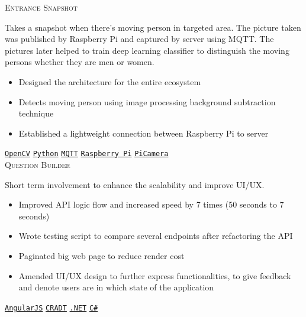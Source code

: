 \documentclass[9pt]{developercv} %
\begin{document}
\begin{entrylist}
{		\textsc{Entrance Snapshot} \\
			{\small Takes a snapshot when there's moving person in targeted area. The picture taken was published by Raspberry Pi and captured by server using MQTT. The pictures later helped to train deep learning classifier to distinguish the moving persons whether they are men or women.
			\begin{itemize}
				\item Designed the architecture for the entire ecosystem
				\item Detects moving person using image processing background subtraction technique
				\item Established a lightweight connection between Raspberry Pi to server
			\end{itemize}}
			\texttt{\href{https://opencv.org/}{OpenCV}}
				\slashsep
			\texttt{\href{https://www.python.org/}{Python}}
				\slashsep
			\texttt{\href{http://mqtt.org/}{MQTT}}
				\slashsep
			\texttt{\href{https://www.raspberrypi.org/products/raspberry-pi-3-model-b-plus/}{Raspberry Pi}}
				\slashsep
			\texttt{\href{https://www.raspberrypi.org/products/camera-module-v2/}{PiCamera}}
\\

		\textsc{Question Builder} \\
			{\small Short term involvement to enhance the scalability and improve UI/UX.
			\begin{itemize}
				\item Improved API logic flow and increased speed by 7 times (50 seconds to 7 seconds)
				\item Wrote testing script to compare several endpoints after refactoring the API
				\item Paginated big web page to reduce render cost
				\item Amended UI/UX design to further express functionalities, to give feedback and denote users are in which state of the application
			\end{itemize}}
			\texttt{\href{https://angularjs.org/}{AngularJS}}
				\slashsep
			\texttt{\href{https://cradt.wordpress.com/}{CRADT}}
				\slashsep
			\texttt{\href{https://docs.microsoft.com/en-us/dotnet/standard/index}{.NET}}
				\slashsep
			\texttt{\href{https://docs.microsoft.com/en-us/dotnet/csharp/}{C\#}}
\\

}
\end{entrylist}
\end{document}
